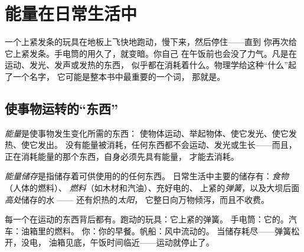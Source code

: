 \chapter{能量在日常生活中}\label{ch:g5:everyday-energy}

一个上紧发条的玩具在地板上飞快地跑动，慢下来，然后停住——直到
你再次给它上紧发条。手电筒的用久了，就变暗。你自己
在午饭前也会没了力气。凡是在运动、发光、发声或发热的东西，
似乎都在消耗着什么。物理学给这种“什么”起了一个名字，
它可能是整本书中最重要的一个词，
那就是。

\section{使事物运转的“东西”}

\begin{definition}[能量]\label{def:g5:everyday-energy:energy}
\emph{能量}是使事物发生变化所需的东西：
使物体运动、举起物体、使它发光、使它发热、使它发出。
没有能量被消耗，任何东西都不会运动、发光或生长——而且，
正在消耗能量的那个东西，自身必须先具有能量，
才能去消耗。
\end{definition}

\begin{definition}[能量储存]\label{def:g5:everyday-energy:store}
\emph{能量储存}是指储存着可供使用的的任何东西。
日常生活中主要的储存有：\emph{食物}（人体的燃料）、
\emph{燃料}（如木材和汽油）、充好电的\emph{}、
上紧的\emph{弹簧}，以及大坝后面\emph{高处}储存的水 ——
还有炽热的\emph{太阳}，
它整日向万物倾泻，而且不收费。
\end{definition}

\begin{example}[找出储存]\label{ex:g5:everyday-energy:spot}
每一个在运动的东西背后都有。跑动的玩具：它上紧的弹簧。
手电筒：它的。汽车：油箱里的燃料。
你：你的早餐。帆船：风中流动的。
当储存耗尽——弹簧松开，没电，
油箱见底，午饭时间临近——运动就停止了。
\end{example}


